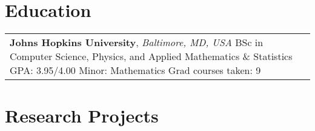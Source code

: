 \documentclass[10pt]{article} %
\begin{document}
\section{Education} 




\vspace{-0.4cm}
\begin{longtable}{L{4cm}@{\hskip 0.15in}L{13.5cm}} %
	
	
	
	{\textbf{Johns Hopkins University}, \textit{Baltimore, MD, USA}} %
	{BSc in Computer Science, Physics, and Applied Mathematics \& Statistics} %
	{GPA: 3.95/4.00} %
	{Minor: Mathematics} %
        {Grad courses taken: 9}
	
	

\end{longtable}

\section{Research Projects}

\end{document}
